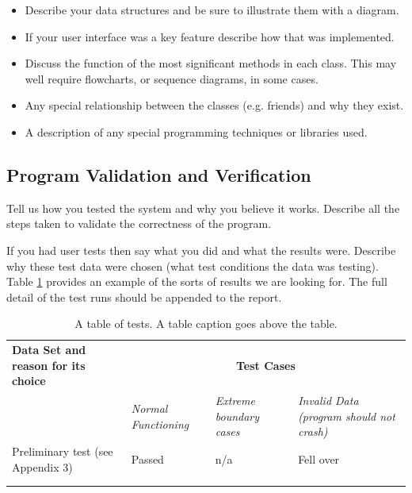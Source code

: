 \documentclass[11pt,a4paper]{article}
\begin{document}
\begin{itemize}
\item Describe your data structures and be sure to illustrate them
  with a diagram.

\item If your user interface was a key feature describe how that was
  implemented.

\item Discuss the function of the most significant methods in each
  class. This may well require flowcharts, or sequence diagrams, in
  some cases.

\item Any special relationship between the classes (e.g. friends) and
  why they exist.

\item A description of any special programming techniques or libraries
  used.
\end{itemize}

\subsection{Program Validation and Verification}
\label{ss:progr-valid-verif}

Tell us how you tested the system and why you believe it works.
Describe all the steps taken to validate the correctness of the
program.

If you had user tests then say what you did and what the results
were. Describe why these test data were chosen (what test conditions
the data was testing).  Table \ref{tab:tests} provides an example of
the sorts of results we are looking for. The full detail of the test
runs should be appended to the report.

\begin{table}[h!]
  \centering
\caption{A table of tests. A table caption goes above the table.}

  \begin{tabular}[t]{|p{5cm}|p{3cm}|p{3cm}|p{3cm}|} \hline \textbf{Data Set
    and reason for its choice} & \multicolumn{3}{c|}{\textbf{Test Cases}}\\
    \cline{2-4} & \emph{Normal Functioning} & \emph{Extreme boundary cases} &
    \emph{Invalid Data (program should not crash)} \\ \hline Preliminary test
    (see Appendix 3) & Passed & n/a & Fell over \\\hline &&&\\ \hline
    &&&\\ \hline
  \end{tabular}

\label{tab:tests}
\end{table}
\end{document}
